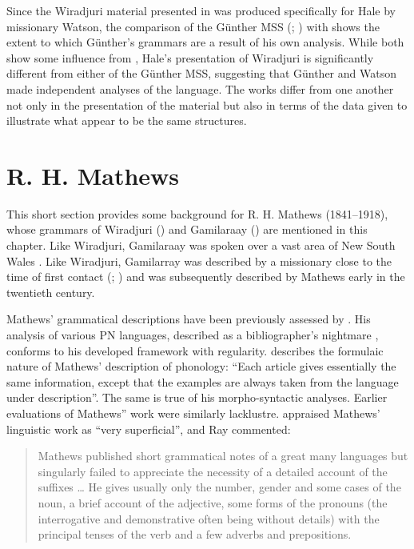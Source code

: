 Since the Wiradjuri material presented in \citet{hale_languages_1846} was produced specifically for Hale by missionary Watson, the comparison of the Günther MSS (\citeyear{gunther_native_1838}; \citeyear{gunther_lecture_1840}) with \citet{hale_languages_1846} shows the extent to which Günther’s grammars are a result of his own analysis. While both show some influence from \citet{threlkeld_australian_1834}, Hale’s presentation of Wiradjuri is significantly different from either of the Günther MSS, suggesting that Günther and Watson made independent analyses of the language. The works differ from one another not only in the presentation of the material but also in terms of the data given to illustrate what appear to be the same structures. 

\section{R. H. Mathews}
\label{sec:key:4.3}

This short section provides some background for R. H. Mathews (1841--1918), whose grammars of Wiradjuri (\citeyear{mathews_wiradyuri_1904}) and Gamilaraay (\citeyear{mathews_languages_1903}) are mentioned in this chapter. Like Wiradjuri, Gamilaraay was spoken over a vast area of New South Wales \citep[2--3]{austin_dictionary_1992}. Like Wiradjuri, Gamilarray was described by a missionary close to the time of first contact (\citealt{ridley_kamilaroi_1875}; ) and was subsequently described by Mathews early in the twentieth century.

Mathews' grammatical descriptions have been previously assessed by \citet{koch_r_2008}. His analysis of various PN languages, described as a bibliographer’s nightmare \citep[181]{koch_r_2008}, conforms to his developed framework with regularity. \citet[183]{koch_r_2008} describes the formulaic nature of Mathews' description of phonology: “Each article gives essentially the same information, except that the examples are always taken from the language under description”. The same is true of his morpho-syntactic analyses. Earlier evaluations of Mathews” work were similarly lacklustre. \citet[133]{elkin_nature_1937} appraised Mathews' linguistic work as “very superficial”, and Ray commented:

\begin{quote}
    Mathews published short grammatical notes of a great many languages but singularly failed to appreciate the necessity of a detailed account of the suffixes … He gives usually only the number, gender and some cases of the noun, a brief account of the adjective, some forms of the pronouns (the interrogative and demonstrative often being without details) with the principal tenses of the verb and a few adverbs and prepositions. \citep[2]{ray_aboriginal_1925}
\end{quote}

